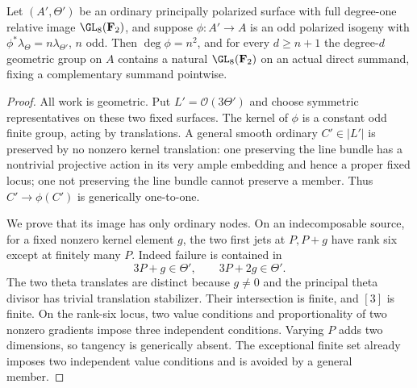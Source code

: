 \begin{lemma}
\label{lem:ordinary-ppav-isogeny-block}
Let $(A',\Theta')$ be an ordinary principally polarized surface with
full degree-one relative image $\GL_8(\mathbf F_2)$, and suppose
$\phi:A'\to A$ is an odd polarized isogeny with
$\phi^*\lambda_\Theta=n\lambda_{\Theta'}$, $n$ odd.
Then $\deg\phi=n^2$, and for every $d\ge n+1$ the degree-$d$
geometric group on $A$ contains a natural $\GL_8(\mathbf F_2)$ on an
actual direct summand, fixing a complementary summand pointwise.
\end{lemma}
\begin{proof}
All work is geometric. Put $L'=\mathcal O(3\Theta')$ and choose symmetric
representatives on these two fixed surfaces. The kernel of $\phi$ is a
constant odd finite group, acting by translations.
A general smooth ordinary $C'\in|L'|$ is preserved by no nonzero kernel
translation: one preserving the line bundle has a nontrivial projective
action in its very ample embedding and hence a proper fixed locus; one
not preserving the line bundle cannot preserve a member. Thus
$C'\to\phi(C')$ is generically one-to-one.

We prove that its image has only ordinary nodes. On an indecomposable
source, for a fixed nonzero kernel element $g$, the two first jets at
$P,P+g$ have rank six except at finitely many $P$. Indeed failure is
contained in
\[
               3P+g\in\Theta',\qquad 3P+2g\in\Theta'.
\]
The two theta translates are distinct because $g\ne0$ and the principal
theta divisor has trivial translation stabilizer. Their intersection is
finite, and $[3]$ is finite. On the rank-six locus, two value conditions
and proportionality of two nonzero gradients impose three independent
conditions. Varying $P$ adds two dimensions, so tangency is generically
absent. The exceptional finite set already imposes two independent value
conditions and is avoided by a general member.


\end{proof}
